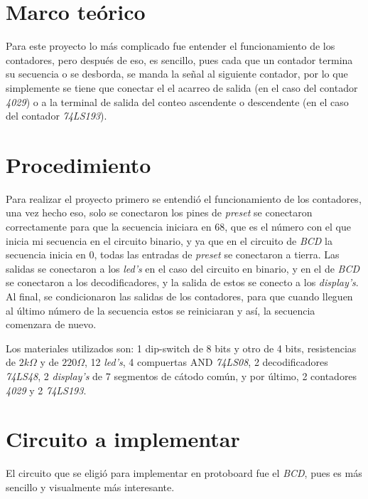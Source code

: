 \documentclass[12pt, oneside]{article}
\begin{document}
\section{Marco teórico}
{\sffamily\large
    \hspace{0.5cm} Para este proyecto lo más complicado fue entender el funcionamiento de los
    contadores, pero después de eso, es sencillo, pues cada que un contador termina su secuencia
    o se desborda, se manda la señal al siguiente contador, por lo que simplemente se tiene que
    conectar el el acarreo de salida (en el caso del contador \emph{4029}) o a la terminal de
    salida del conteo ascendente o descendente (en el caso del contador \emph{74LS193}).

}

\newpage
\section{Procedimiento}
{\sffamily\large
    \hspace{0.5cm} Para realizar el proyecto primero se entendió el funcionamiento de los
    contadores, una vez hecho eso, solo se conectaron los pines de \emph{preset} se conectaron
    correctamente para que la secuencia iniciara en $68$, que es el número con el que inicia mi
    secuencia en el circuito binario, y ya que en el circuito de \emph{BCD} la secuencia inicia
    en $0$, todas las entradas de \emph{preset} se conectaron a tierra. Las salidas se conectaron
    a los \emph{led's} en el caso del circuito en binario, y en el de \emph{BCD} se conectaron a
    los decodificadores, y la salida de estos se conecto a los \emph{display's}. Al final, se
    condicionaron las salidas de los contadores, para que cuando lleguen al último número de la
    secuencia estos se reiniciaran y así, la secuencia comenzara de nuevo.

    \hspace{0.5cm} Los materiales utilizados son: 1 dip-switch de 8 bits y otro de 4 bits,
    resistencias de $2k\Omega$ y de $220\Omega$, 12 \emph{led's}, 4 compuertas AND \emph{74LS08},
    2 decodificadores \emph{74LS48}, 2 \emph{display's} de 7 segmentos de cátodo común, y por
    último, 2 contadores \emph{4029} y 2 \emph{74LS193}.

}

\section{Circuito a implementar}
{\sffamily\large
    \hspace{0.5cm} El circuito que se eligió para implementar en protoboard fue el \emph{BCD},
    pues es más sencillo y visualmente más interesante.

}
\end{document}
